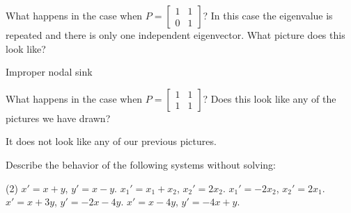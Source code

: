 \begin{exercise}
What happens in the case when $P = 
\left[ \begin{smallmatrix} 1 & 1 \\ 0 & 1 \end{smallmatrix} \right]$?  In
this case the eigenvalue is repeated and there is only one independent eigenvector.
What
picture does this look like?
\end{exercise}
\comboSol{%
}
{%
Improper nodal sink \hfill{}\hfill\hfill
}

\begin{exercise}
What happens in the case when $P = 
\left[ \begin{smallmatrix} 1 & 1 \\ 1 & 1 \end{smallmatrix} \right]$?
Does this look like any of the pictures we have drawn?
\end{exercise}
\comboSol{%
}
{%
It does not look like any of our previous pictures. \hfill{}\hfill\hfill
}

\begin{exercise}\ansMark%
Describe the behavior of the following systems without solving:
\begin{tasks}(2)
\task $x' = x + y$, \quad $y' = x-y$.
\task $x_1' = x_1 + x_2$, \quad $x_2' = 2 x_2$.
\task $x_1' = -2x_2$, \quad $x_2' = 2 x_1$.
\task $x' = x + 3y$, \quad $y' = -2x-4y$.
\task $x' = x - 4y$, \quad $y' = -4x+y$.
\end{tasks}
\end{exercise}

